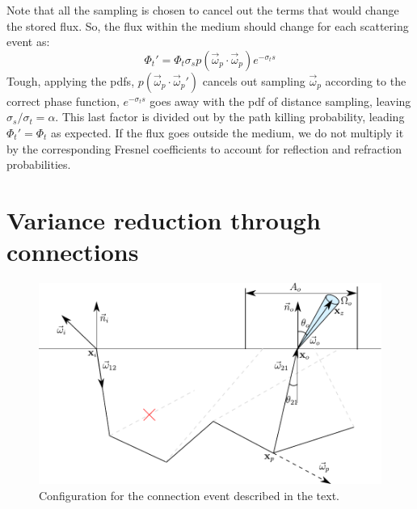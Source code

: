 \documentclass[10pt,a4paper]{article}
\newcommand{\vomega}{\vec{\omega}}
\begin{document}
Note that all the sampling is chosen to cancel out the terms that would change the stored flux. So, the flux within the medium should change for each scattering event as:
$$
\Phi_t' = \Phi_t \sigma_s p(\vomega_p \cdot \vomega_p) e^{-\sigma_t s}
$$
Tough, applying the pdfs, $ p(\vomega_p \cdot \vomega_p')$ cancels out sampling $\vomega_p$ according to the correct phase function, $e^{-\sigma_t s}$ goes away with the pdf of distance sampling, leaving $\sigma_s/\sigma_t = \alpha$. This last factor is divided out by the path killing probability, leading $\Phi_t' = \Phi_t$ as expected.
If the flux goes outside the medium, we do not multiply it by the corresponding Fresnel coefficients to account for reflection and refraction probabilities.
 
\section{Variance reduction through connections}
\begin{figure}[h]
\includegraphics[scale=0.7]{configuration.pdf} 
\caption{Configuration for the connection event described in the text.}
\label{fig:diagram}
\end{figure}
\end{document}
